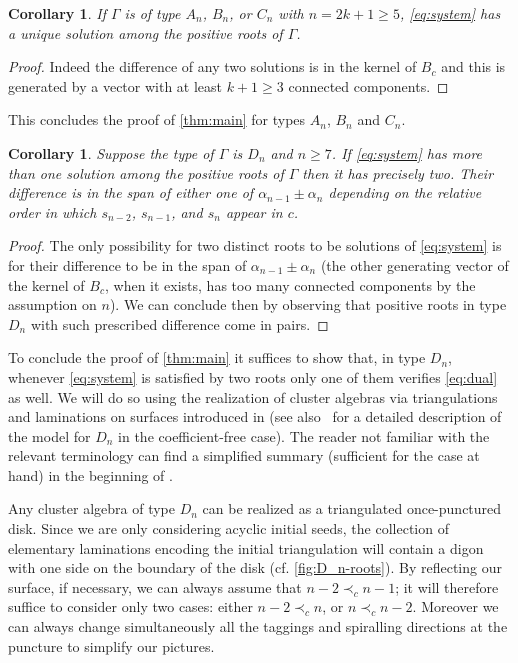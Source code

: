 \documentclass[pdftex]{sigma}
\numberwithin{equation}{section}
\numberwithin{figure}{section}
\newtheorem{Corollary}[Theorem]{Corollary}
\begin{document}
  \begin{Corollary}
    If $\Gamma$ is of type $A_n$, $B_n$, or $C_n$ with $n=2k+1\geq 5$, \cref{eq:system} has a unique solution among the positive roots of $\Gamma$.
  \end{Corollary}
  \begin{proof}
    Indeed the difference of any two solutions is in the kernel of $B_c$ and this is generated by a vector with at least $k+1\geq3$ connected components.
  \end{proof}
  This concludes the proof of \cref{thm:main} for types $A_n$, $B_n$ and $C_n$.

  \begin{Corollary}
    \label{cor:kernel-Dn}
    Suppose the type of $\Gamma$ is $D_n$ and $n\geq 7$.
    If \cref{eq:system} has more than one solution among the positive roots of $\Gamma$ then it has precisely two.
    Their difference is in the span of either one of $\alpha_{n-1}\pm\alpha_n$ depending on the relative order in which $s_{n-2}$, $s_{n-1}$, and $s_n$ appear in $c$.
  \end{Corollary}
  \begin{proof}
    The only possibility for two distinct roots to be solutions of \cref{eq:system} is for their difference to be in the span of $\alpha_{n-1}\pm\alpha_n$ (the other generating vector of the kernel of $B_c$, when it exists, has too many connected components by the assumption on $n$).
    We can conclude then by observing that positive roots in type $D_n$ with such prescribed difference come in pairs.
  \end{proof}

  To conclude the proof of \cref{thm:main} it suffices to show that, in type $D_n$, whenever \cref{eq:system} is satisfied by two roots only one of them verifies \cref{eq:dual} as well.
  We will do so using the realization of cluster algebras via triangulations and laminations on surfaces introduced in \cite{FST08,FT12} (see also~\cite{Sch08} for a detailed description of the model for $D_n$ in the coefficient-free case).
  The reader not familiar with the relevant terminology can find a simplified summary (sufficient for the case at hand) in the beginning of \cite[Section 4.1]{NS14}.

  Any cluster algebra of type $D_n$ can be realized as a triangulated once-punctured disk.
  Since we are only considering acyclic initial seeds, the collection of elementary laminations encoding the initial triangulation will contain a digon with one side on the boundary of the disk (cf. \cref{fig:D_n-roots}).
  By reflecting our surface, if necessary, we can always assume that $n-2 \prec_c n-1$; it will therefore suffice to consider only two cases: either $n-2 \prec_c n$, or $n \prec_c n-2$.
  Moreover we can always change simultaneously all the taggings and spiralling directions at the puncture to simplify our pictures.
\end{document}
